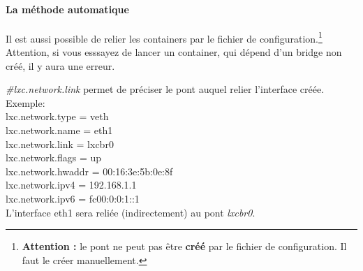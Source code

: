 \paragraph{La m\'ethode automatique}

Il est aussi possible de relier les containers par le fichier de configuration.\footnote{\textbf{Attention : }le pont ne peut pas \^etre \textbf{cr\'e\'e} par le fichier de configuration. Il faut le cr\'eer manuellement.}
Attention, si vous esssayez de lancer un container, qui d\'epend d'un bridge non cr\'e\'e, il y aura une erreur.

\noindent
\emph{\#lxc.network.link} permet de pr\'eciser le pont auquel relier l'interface cr\'e\'ee.\\

Exemple:\\
\noindent
lxc.network.type = veth\\
lxc.network.name = eth1\\
lxc.network.link = lxcbr0\\
lxc.network.flags = up\\
lxc.network.hwaddr = 00:16:3e:5b:0e:8f\\
lxc.network.ipv4 = 192.168.1.1\\
lxc.network.ipv6 = fc00:0:0:1::1\\

\noindent
L'interface eth1 sera reli\'ee (indirectement) au pont \emph{lxcbr0}.

